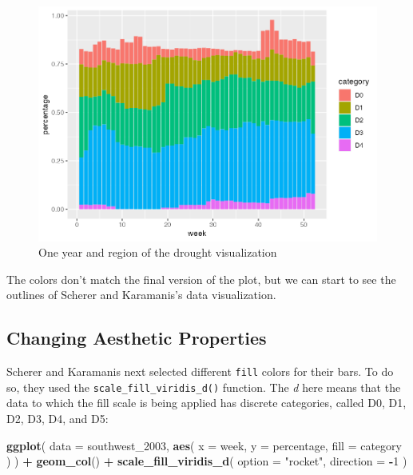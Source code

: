 \documentclass[
]{book}
\newenvironment{Shaded}{\begin{snugshade}}{\end{snugshade}}
\newcommand{\AttributeTok}[1]{\textcolor[rgb]{0.13,0.29,0.53}{#1}}
\newcommand{\DecValTok}[1]{\textcolor[rgb]{0.00,0.00,0.81}{#1}}
\newcommand{\FunctionTok}[1]{\textcolor[rgb]{0.13,0.29,0.53}{\textbf{#1}}}
\newcommand{\NormalTok}[1]{#1}
\newcommand{\SpecialCharTok}[1]{\textcolor[rgb]{0.81,0.36,0.00}{\textbf{#1}}}
\newcommand{\StringTok}[1]{\textcolor[rgb]{0.31,0.60,0.02}{#1}}
\begin{document}
\begin{figure}
\includegraphics[width=1\linewidth]{data-viz_files/figure-latex/southwest-2003-no-style-plot-1} \caption{One year and region of the drought visualization}\label{fig:southwest-2003-no-style-plot}
\end{figure}

The colors don't match the final version of the plot, but we can start to see the outlines of Scherer and Karamanis's data visualization.

\hypertarget{changing-aesthetic-properties}{%
\subsection*{Changing Aesthetic Properties}\label{changing-aesthetic-properties}}

Scherer and Karamanis next selected different \texttt{fill} colors for their bars. To do so, they used the \texttt{scale\_fill\_viridis\_d()} function. The \emph{d} here means that the data to which the fill scale is being applied has discrete categories, called D0, D1, D2, D3, D4, and D5:

\begin{Shaded}
\begin{Highlighting}[]
\FunctionTok{ggplot}\NormalTok{(}
  \AttributeTok{data =}\NormalTok{ southwest\_2003,}
  \FunctionTok{aes}\NormalTok{(}
    \AttributeTok{x =}\NormalTok{ week,}
    \AttributeTok{y =}\NormalTok{ percentage,}
    \AttributeTok{fill =}\NormalTok{ category}
\NormalTok{  )}
\NormalTok{) }\SpecialCharTok{+}
  \FunctionTok{geom\_col}\NormalTok{() }\SpecialCharTok{+}
  \FunctionTok{scale\_fill\_viridis\_d}\NormalTok{(}
    \AttributeTok{option =} \StringTok{"rocket"}\NormalTok{,}
    \AttributeTok{direction =} \SpecialCharTok{{-}}\DecValTok{1}
\NormalTok{  )}
\end{Highlighting}
\end{Shaded}
\end{document}
